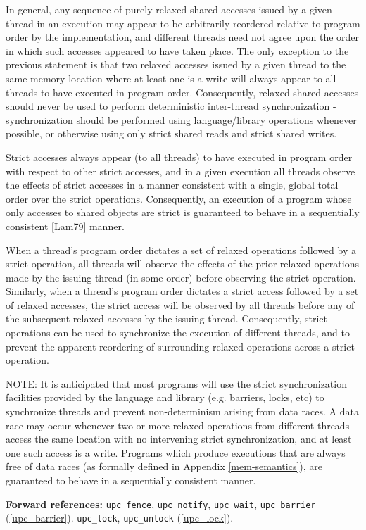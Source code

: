 \np In general, any sequence of purely relaxed shared accesses
  issued by a given
  thread in an execution may appear to be arbitrarily reordered relative to
  program order by the implementation, and different threads need not agree upon
  the order in which such accesses appeared to have taken place. The only
  exception to the previous statement is that two relaxed accesses issued by a
  given thread to the same memory location where at least one is a write will
  always appear to all threads to have executed in program order. Consequently,
  relaxed shared accesses should never be used to perform deterministic
  inter-thread synchronization - synchronization should be performed using
  language/library operations whenever possible, or otherwise using only strict
  shared reads and strict shared writes.

\np Strict accesses always appear (to all threads) to have executed
  in program
  order with respect to other strict accesses, and in a given execution all
  threads observe the effects of strict accesses in a manner consistent with a
  single, global total order over the strict operations. Consequently, an
  execution of a program whose only accesses to shared objects are strict 
  is guaranteed to behave in a sequentially consistent [Lam79] manner.

\np When a thread's program order dictates a set of relaxed
  operations followed by
  a strict operation, all threads will observe the effects of the prior relaxed
  operations made by the issuing thread (in some order) before observing the
  strict operation. Similarly, when a thread's program order dictates a strict
  access followed by a set of relaxed accesses, the strict access will be
  observed by all threads before any of the subsequent relaxed accesses by the
  issuing thread. Consequently, strict operations can be used to synchronize the
  execution of different threads, and to prevent the apparent reordering of
  surrounding relaxed operations across a strict operation.

\np NOTE: It is anticipated that most programs will use the strict 
  synchronization facilities provided by the
  language and library (e.g. barriers, locks, etc) to synchronize threads and
  prevent non-determinism arising from data races. A data race may occur whenever
  two or more relaxed operations from different threads access the same location
  with no intervening strict synchronization, and at least one such access is a
  write. Programs which produce executions that are always free of data races (as
  formally defined in Appendix \ref{mem-semantics}), are guaranteed to behave in
  a sequentially consistent manner.

   {\bf Forward references:} {\tt upc\_fence}, {\tt upc\_notify}, 
    {\tt upc\_wait}, {\tt upc\_barrier} (\ref{upc_barrier}). {\tt upc\_lock},
    {\tt upc\_unlock} (\ref{upc_lock}).
    
